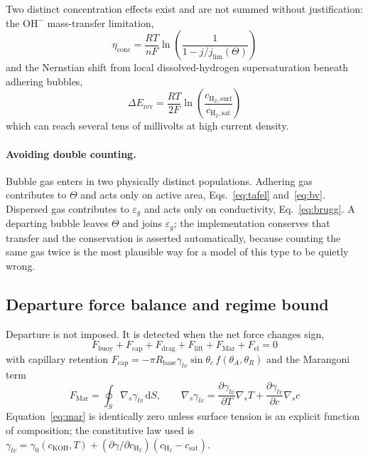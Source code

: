 \documentclass[11pt,a4paper]{article}
\begin{document}
Two distinct concentration effects exist and are not summed without justification: the
$\mathrm{OH^-}$ mass-transfer limitation,
\begin{equation}
\eta_{\mathrm{conc}} = \frac{RT}{nF}\ln\!\left(\frac{1}{1-j/j_{\mathrm{lim}}(\Theta)}\right)
\end{equation}
and the Nernstian shift from local dissolved-hydrogen supersaturation beneath adhering bubbles,
\begin{equation}
\Delta E_{\mathrm{rev}} = \frac{RT}{2F}\ln\!\left(\frac{c_{\mathrm{H_2,surf}}}{c_{\mathrm{H_2,sat}}}\right)
\end{equation}
which can reach several tens of millivolts at high current density.

\paragraph{Avoiding double counting.} Bubble gas enters in two physically distinct populations.
Adhering gas contributes to $\Theta$ and acts only on active area, Eqs.~\eqref{eq:tafel}
and~\eqref{eq:bv}. Dispersed gas contributes to $\varepsilon_g$ and acts only on conductivity,
Eq.~\eqref{eq:brugg}. A departing bubble leaves $\Theta$ and joins $\varepsilon_g$; the
implementation conserves that transfer and the conservation is asserted automatically, because
counting the same gas twice is the most plausible way for a model of this type to be quietly wrong.

\subsection{Departure force balance and regime bound}
Departure is not imposed. It is detected when the net force changes sign,
\begin{equation}
F_{\mathrm{buoy}} + F_{\mathrm{cap}} + F_{\mathrm{drag}} + F_{\mathrm{lift}}
+ F_{\mathrm{Mar}} + F_{\mathrm{el}} = 0
\label{eq:forcebal}
\end{equation}
with capillary retention $F_{\mathrm{cap}} = -\pi R_{\mathrm{base}}\gamma_{lv}\sin\theta_c\,
f(\theta_A,\theta_R)$ and the Marangoni term
\begin{equation}
F_{\mathrm{Mar}} = \oint_S \nabla_s \gamma_{lv}\,\mathrm{d}S,\qquad
\nabla_s\gamma_{lv} = \frac{\partial\gamma_{lv}}{\partial T}\nabla_s T
+ \frac{\partial\gamma_{lv}}{\partial c}\nabla_s c
\label{eq:mar}
\end{equation}
Equation~\eqref{eq:mar} is identically zero unless surface tension is an explicit function of
composition; the constitutive law used is
$\gamma_{lv} = \gamma_0(c_{\mathrm{KOH}},T) + (\partial\gamma/\partial c_{\mathrm{H_2}})
(c_{\mathrm{H_2}}-c_{\mathrm{sat}})$.
\end{document}
